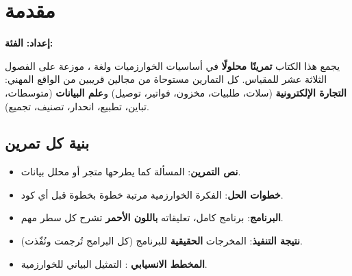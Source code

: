 \chapter*{مقدمة}

\begin{tcolorbox}[enhanced, colback=brandTeal!9, colframe=brandTeal!45, boxrule=0.5pt, arc=4pt,
    coltext=brandDark, left=4mm, right=4mm]
\faUserTie\quad \textbf{إعداد:} \teacher \hfill \faUsers\quad \textbf{الفئة:} \audience
\end{tcolorbox}

يجمع هذا الكتاب \textbf{ تمرينًا محلولًا} في أساسيات الخوارزميات ولغة ،
موزعة على الفصول الثلاثة عشر للمقياس. كل التمارين مستوحاة من مجالين قريبين من
الواقع المهني: \textbf{التجارة الإلكترونية} (سلات، طلبيات، مخزون، فواتير، توصيل) و\textbf{علم البيانات}
(متوسطات، تباين، تطبيع، انحدار، تصنيف، تجميع).

\section*{بنية كل تمرين}

\begin{center}
\end{center}

\begin{itemize}
    \item \textbf{نص التمرين}: المسألة كما يطرحها متجر أو محلل بيانات.
    \item \textbf{خطوات الحل}: الفكرة الخوارزمية مرتبة خطوة بخطوة قبل أي كود.
    \item \textbf{البرنامج}: برنامج  كامل، تعليقاته \textcolor{cmtRed}{\textbf{باللون الأحمر}} تشرح كل سطر مهم.
    \item \textbf{نتيجة التنفيذ}: المخرجات \textbf{الحقيقية} للبرنامج (كل البرامج تُرجمت ونُفّذت).
    \item \textbf{المخطط الانسيابي} : التمثيل البياني للخوارزمية.
\end{itemize}

